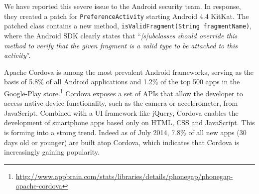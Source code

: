 We have reported this severe issue to the Android security team. In response, they
created a patch for \texttt{PreferenceActivity} starting Android 4.4 KitKat. 
The patched class contains a new method, \texttt{isValidFragment(String fragmentName)}, 
where the Android SDK clearly states that 
``\textit{[s]ubclasses should override this method to verify that the given fragment is a valid type to be attached to this activity}''.
%	
%	
%	

\label{Se:CordovaXAS}

Apache Cordova is among the most prevalent Android frameworks, serving as the basis of 5.8\% of all Android applications and 1.2\% of the top 500 apps in the Google-Play store.\footnote{\url{http://www.appbrain.com/stats/libraries/details/phonegap/phonegap-apache-cordova}} Cordova exposes a set of APIs that allow the developer to access native device functionality, such as the camera or accelerometer, from JavaScript. Combined with a UI framework like jQuery, Cordova enables the development of smartphone apps based only
on HTML, CSS and JavaScript. This is forming into a strong trend. Indeed as of July 2014, 7.8\% of all new apps (30 days old or younger) are built atop Cordova, which indicates that Cordova is increasingly gaining popularity.

